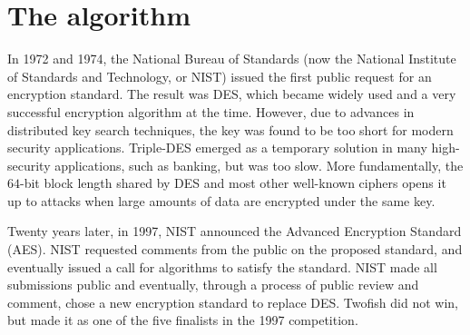 \section{The algorithm}
In 1972 and 1974, the National Bureau of Standards (now the National Institute of Standards and Technology, or NIST) issued the first public request for an encryption standard. The result was DES\cite{NBS77}, which became widely used and a very successful encryption algorithm at the time. However, due to advances in distributed key search techniques, the key was found to be too short for modern security applications.
Triple-DES emerged as a temporary solution in many high-security applications, such as banking, but was too slow. More fundamentally, the $64$-bit block length shared by DES and most other well-known ciphers opens it up to attacks when large amounts of data are encrypted under the same key.

Twenty years later, in 1997, NIST announced the Advanced Encryption Standard (AES)\cite{NIST97a}. NIST requested comments from the public on the proposed standard, and eventually issued a call for algorithms to satisfy the standard\cite{NIST97b}. NIST made all submissions public and eventually, through a process of public review and comment, chose a new encryption standard to replace DES. Twofish did not win, but made it as one of the five finalists in the 1997 competition.

